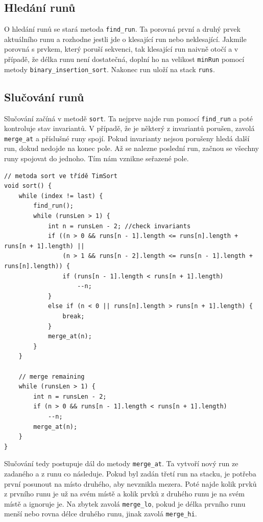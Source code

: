 \documentclass[thesis=B,czech]{FITthesis}[2019/12/23]
\begin{document}
\subsection{Hledání runů}
O hledání runů se stará metoda \texttt{find\_run}. Ta porovná první a druhý prvek aktuálního runu a rozhodne jestli jde o klesající run nebo neklesající. Jakmile porovná s prvkem, který poruší sekvenci, tak klesající run naivně otočí a v případě, že délka runu není dostatečná, doplní ho na velikost \texttt{minRun} pomocí metody \texttt{binary\_insertion\_sort}. Nakonec run uloží na stack \texttt{runs}.

\subsection{Slučování runů}
Slučování začíná v metodě \texttt{sort}. Ta nejprve najde run pomocí \texttt{find\_run} a poté kontroluje stav invariantů. V případě, že je některý z invariantů porušen, zavolá \texttt{merge\_at} a příslušné runy spojí. Pokud invarianty nejsou porušeny hledá další run, dokud nedojde na konec pole. Až se nalezne poslední run, začnou se všechny runy spojovat do jednoho. Tím nám vznikne seřazené pole.

\begin{verbatim}
// metoda sort ve třídě TimSort
void sort() {
    while (index != last) {
        find_run();
        while (runsLen > 1) {
            int n = runsLen - 2; //check invariants
            if ((n > 0 && runs[n - 1].length <= runs[n].length + runs[n + 1].length) ||
                (n > 1 && runs[n - 2].length <= runs[n - 1].length + runs[n].length)) {
                if (runs[n - 1].length < runs[n + 1].length)
                    --n;
            }
            else if (n < 0 || runs[n].length > runs[n + 1].length) {
                break;
            }
            merge_at(n);
        }
    }

    // merge remaining
    while (runsLen > 1) {
        int n = runsLen - 2;
        if (n > 0 && runs[n - 1].length < runs[n + 1].length)
            --n;
        merge_at(n);
    }
}
\end{verbatim}

Slučování tedy postupuje dál do metody \texttt{merge\_at}. Ta vytvoří nový run ze zadaného a z runu co následuje. Pokud byl zadán třetí run na stacku, je potřeba první posunout na místo druhého, aby nevznikla mezera. Poté najde kolik prvků z prvního runu je už na svém místě a kolik prvků z druhého runu je na svém místě a ignoruje je. Na zbytek zavolá \texttt{merge\_lo}, pokud je délka prvního runu menší nebo rovna délce druhého runu, jinak zavolá \texttt{merge\_hi}.
\end{document}
